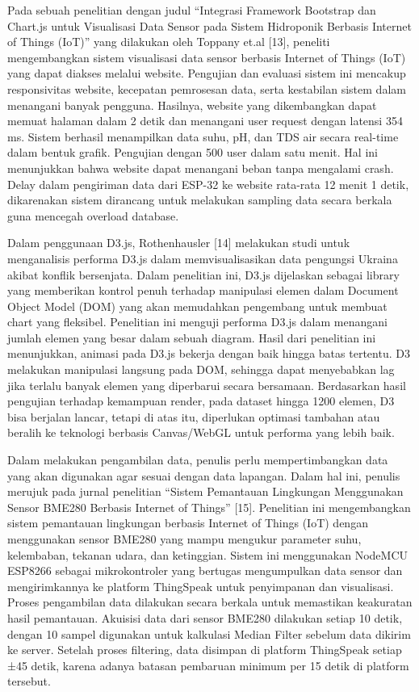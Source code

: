 Pada sebuah penelitian dengan judul “Integrasi Framework Bootstrap dan Chart.js untuk Visualisasi Data Sensor pada Sistem Hidroponik Berbasis Internet of Things (IoT)” yang dilakukan oleh Toppany et.al [13], peneliti mengembangkan sistem visualisasi data sensor berbasis Internet of Things (IoT) yang dapat diakses melalui website. Pengujian dan evaluasi sistem ini mencakup responsivitas website, kecepatan pemrosesan data, serta kestabilan sistem dalam menangani banyak pengguna. Hasilnya, website yang dikembangkan dapat memuat halaman dalam 2 detik dan menangani user request dengan latensi 354 ms. Sistem berhasil menampilkan data suhu, pH, dan TDS air secara real-time dalam bentuk grafik. Pengujian dengan 500 user dalam satu menit. Hal ini menunjukkan bahwa website dapat menangani beban tanpa mengalami crash. Delay dalam pengiriman data dari ESP-32 ke website rata-rata 12 menit 1 detik, dikarenakan sistem dirancang untuk melakukan sampling data secara berkala guna mencegah overload database. 

Dalam penggunaan D3.js, Rothenhausler [14] melakukan studi untuk menganalisis performa D3.js dalam memvisualisasikan data pengungsi Ukraina akibat konflik bersenjata. Dalam penelitian ini, D3.js dijelaskan sebagai library yang memberikan kontrol penuh terhadap manipulasi elemen dalam Document Object Model (DOM) yang akan memudahkan pengembang untuk membuat chart yang fleksibel. Penelitian ini menguji performa D3.js dalam menangani jumlah elemen yang besar dalam sebuah diagram. Hasil dari penelitian ini menunjukkan, animasi pada D3.js bekerja dengan baik hingga batas tertentu. D3 melakukan manipulasi langsung pada DOM, sehingga dapat menyebabkan lag jika terlalu banyak elemen yang diperbarui secara bersamaan. Berdasarkan hasil pengujian terhadap kemampuan render, pada dataset hingga 1200 elemen, D3 bisa berjalan lancar, tetapi di atas itu, diperlukan optimasi tambahan atau beralih ke teknologi berbasis Canvas/WebGL untuk performa yang lebih baik. 

Dalam melakukan pengambilan data, penulis perlu mempertimbangkan data yang akan digunakan agar sesuai dengan data lapangan. Dalam hal ini, penulis merujuk pada jurnal penelitian “Sistem Pemantauan Lingkungan Menggunakan Sensor BME280 Berbasis Internet of Things” [15]. Penelitian ini mengembangkan sistem pemantauan lingkungan berbasis Internet of Things (IoT) dengan menggunakan sensor BME280 yang mampu mengukur parameter suhu, kelembaban, tekanan udara, dan ketinggian. Sistem ini menggunakan NodeMCU ESP8266 sebagai mikrokontroler yang bertugas mengumpulkan data sensor dan mengirimkannya ke platform ThingSpeak untuk penyimpanan dan visualisasi. Proses pengambilan data dilakukan secara berkala untuk memastikan keakuratan hasil pemantauan. Akuisisi data dari sensor BME280 dilakukan setiap 10 detik, dengan 10 sampel digunakan untuk kalkulasi Median Filter sebelum data dikirim ke server. Setelah proses filtering, data disimpan di platform ThingSpeak setiap ±45 detik, karena adanya batasan pembaruan minimum per 15 detik di platform tersebut. 

